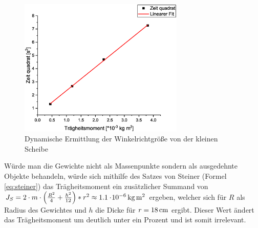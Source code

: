 \begin{figure}
\begin{center}
\includegraphics[width=0.7\textwidth]{Bilder/kal2.eps}
\caption{Dynamische Ermittlung der Winkelrichtgröße von der kleinen Scheibe}
\label{fig:kal2}
\end{center}
\end{figure}

Würde man die Gewichte nicht als Massenpunkte sondern als ausgedehnte Objekte behandeln, würde sich mithilfe des Satzes von Steiner (Formel \ref{eq:steiner}) das Trägheitsmoment ein zusätzlicher Summand von $J_S = 2 \cdot m \cdot \left(\frac{R^2}{4} + \frac{h^2}{12}\right)*r^2 \approx \unit[1.1\e{-6}]{kg \, m^2}$ ergeben, welcher sich für $R$ als Radius des Gewichtes und $h$ die Dicke für $r = \unit[18]{cm}$ ergibt. Dieser Wert ändert das Trägheitsmoment um deutlich unter ein Prozent und ist somit irrelevant.



